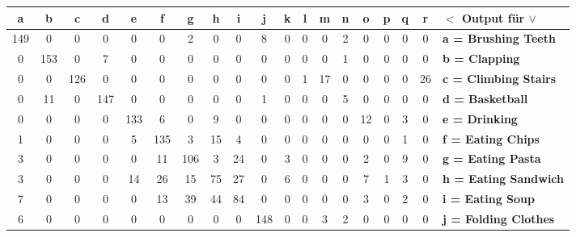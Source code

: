 \begin{table}
	\hspace{-0.75cm}
	\centering
	\begin{tabular}{|c|c|c|c|c|c|c|c|c|c|c|c|c|c|c|c|c|c||l|}
		\hline 
		\textbf{a} &  \textbf{b} & \textbf{c} & \textbf{d} & \textbf{e} & \textbf{f} & \textbf{g} & \textbf{h} & \textbf{i} & \textbf{j} & \textbf{k} & \textbf{l} & \textbf{m} & \textbf{n} & \textbf{o} & \textbf{p} & \textbf{q} & \textbf{r} & \textbf{$<$ Output für $\vee$} \\
		\hline 
		\hline 
		149 & 0 & 0 & 0 & 0 & 0 & 2 & 0 & 0 & 8 & 0 & 0 & 0 & 2 & 0 & 0 & 0 & 0 & \textbf{a = Brushing Teeth} \\
		\hline 
		0 & 153 & 0 & 7 & 0 & 0 & 0 & 0 & 0 & 0 & 0 & 0 & 0 & 1 & 0 & 0 & 0 & 0 & \textbf{b = Clapping} \\
		\hline 
		0 & 0 & 126 & 0 & 0 & 0 & 0 & 0 & 0 & 0 & 0 & 1 &17 & 0 & 0 & 0 & 0 & 26 & \textbf{c = Climbing Stairs} \\
		\hline 
		0 & 11 & 0 & 147 & 0 & 0 & 0 & 0 & 0 & 1 & 0 & 0 & 0 & 5 & 0 & 0 & 0 & 0 & \textbf{d = Basketball} \\
		\hline 
		0 & 0 & 0 & 0 & \cellcolor{lightgray} 133 & \cellcolor{lightgray} 6 & \cellcolor{lightgray} 0 & \cellcolor{lightgray} 9 & \cellcolor{lightgray}  0 & 0 & 0 & 0 & 0 & 0 & 12 & 0 & 3 & 0 & \textbf{e = Drinking} \\
		\hline 
		1 & 0 & 0 & 0 & \cellcolor{lightgray} 5 & \cellcolor{lightgray} 135 & \cellcolor{lightgray} 3 & \cellcolor{lightgray} 15 & \cellcolor{lightgray} 4 & 0 & 0 & 0 & 0 & 0 & 0 & 0 & 1 & 0 & \textbf{f = Eating Chips} \\
		\hline 
		3 & 0 & 0 & 0 & \cellcolor{lightgray} 0 & \cellcolor{lightgray} \cellcolor{lightgray} 11 & \cellcolor{lightgray} 106 & \cellcolor{lightgray} 3 & \cellcolor{lightgray} 24 & 0 & 3 & 0 & 0 & 0 & 2 & 0 & 9 & 0 & \textbf{g = Eating Pasta} \\
		\hline 
		3 & 0 & 0 & 0 & \cellcolor{lightgray} 14 & \cellcolor{lightgray} 26 & \cellcolor{lightgray} 15 & \cellcolor{lightgray} 75 & \cellcolor{lightgray} 27 & 0 & 6 & 0 & 0 & 0 & 7 & 1 & 3 & 0 & \textbf{h = Eating Sandwich} \\
		\hline 
		7 & 0 & 0 & 0 & \cellcolor{lightgray} 0 & \cellcolor{lightgray} 13 & \cellcolor{lightgray} 39 & \cellcolor{lightgray} 44 & \cellcolor{lightgray} 84 & 0 & 0 & 0 & 0 & 0 & 3 & 0 & 2 & 0 & \textbf{i = Eating Soup} \\
		\hline 
		6 & 0 & 0 & 0 & 0 & 0 & 0 & 0 & 0 & 148 & 0 & 0 & 3 & 2 & 0 & 0 & 0 & 0 & \textbf{j = Folding Clothes} \\

\end{tabular}
\end{table}
